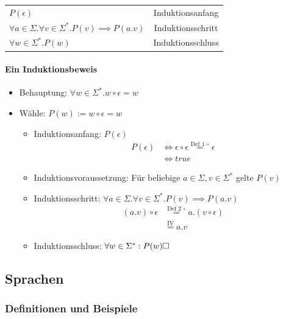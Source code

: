 \documentclass{scrartcl}
\begin{document}
\begin{center}
	\renewcommand{\arraystretch}{1.25}
	\begin{tabular}[ht]{l c}
		$P(\epsilon)$ & Induktionsanfang \\ 
		$\forall a \in \Sigma. \forall v \in \Sigma^*. P(v) \implies P(a.v)$ & Induktionsschritt \\ 
		\hline 
		$\forall w \in \Sigma^*. P(w)$ & Induktionsschluss
	\end{tabular}
\end{center}

\paragraph{Ein Induktionsbeweis}

\begin{itemize}
	\item Behauptung: $\forall w \in \Sigma^*. w \circ \epsilon = w$
	\item Wähle: $P(w) := w \circ \epsilon = w$
	\begin{itemize}
		\item Induktionsanfang: $P(\epsilon)$
		\begin{align*}
			P(\epsilon) &\iff \epsilon \circ \epsilon \stackrel{\text{Def 1 } \circ}{=} \epsilon \\
			&\iff true
		\end{align*}
		\item Induktionsvoraussetzung: Für beliebige $a \in \Sigma, v \in \Sigma^*$ gelte $P(v)$
		\item Induktionsschritt: $\forall a \in \Sigma. \forall v \in \Sigma^*. P(v) \implies P(a.v)$
		\begin{align*}
			(a.v) \circ \epsilon & \stackrel{\text{Def 2 } \circ}{=} a.(v \circ \epsilon) \\
			& \stackrel{\text{IV}}{=} a.v
		\end{align*}
		\item Induktionsschluss: $\forall w \in \Sigma^*: P(w) \hfill \square$
	\end{itemize}
\end{itemize}

\subsection{Sprachen}

\subsubsection{Definitionen und Beispiele}
\end{document}
